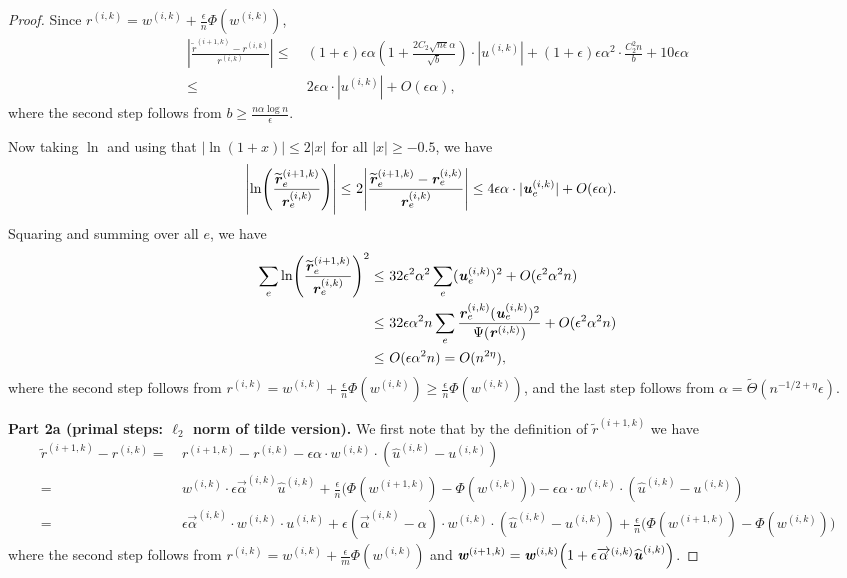 \documentclass[11pt]{article}
\let\originalleft\left
\let\originalright\right
\renewcommand{\left}{\mathopen{}\mathclose\bgroup\originalleft}
\renewcommand{\right}{\aftergroup\egroup\originalright}
\newcommand\rr{\boldsymbol{\mathit{r}}}
\newcommand\uu{\boldsymbol{\mathit{u}}}
\newcommand\ww{\boldsymbol{\mathit{w}}}
\newcommand{\wh}{\widehat}
\newcommand{\wt}{\widetilde}
\begin{document}
\begin{proof}
Since $\rr^{(i,k)} = \ww^{(i,k)} + \frac{\epsilon}{n} \Phi(\ww^{(i,k)})$,
\begin{align*}
|\frac{\wt{\rr}^{(i+1,k)} - \rr^{(i,k)}}{\rr^{(i,k)}}| \leq &~ (1 + \epsilon) \epsilon \alpha (1 + \frac{2 C_2 \sqrt{n \epsilon} \alpha}{\sqrt{b}}) \cdot |\uu^{(i,k)}| + (1 + \epsilon) \epsilon \alpha^2 \cdot \frac{C_2^2 n}{b} + 10 \epsilon \alpha \\
\leq &~ 2 \epsilon \alpha \cdot |\uu^{(i,k)}| + O(\epsilon \alpha),
\end{align*}
where the second step follows from $b \geq \frac{n\alpha\log n}{\epsilon}$.

Now taking $\ln$ and using that $|\ln(1+x)| \leq 2 |x|$ for all $|x| \geq -0.5$, we have
\begin{align*}
\left|\ln\left(\frac{\wt{\rr}^{(i+1,k)}_e}{\rr^{(i,k)}_e}\right)\right| \leq &~ 2 \left|\frac{\wt{\rr}_e^{(i+1,k)} - \rr_e^{(i,k)}}{\rr_e^{(i,k)}}\right| \leq 4 \epsilon \alpha \cdot |\uu_e^{(i,k)}| + O(\epsilon \alpha).
\end{align*}
Squaring and summing over all $e$, we have
\begin{align*}
\sum_e \ln\left(\frac{\wt{\rr}^{(i+1,k)}_e}{\rr^{(i,k)}_e}\right)^2 \leq &~ 32 \epsilon^2 \alpha^2 \sum_e (\uu^{(i,k)}_e)^2 + O(\epsilon^2 \alpha^2 n) \\
\leq &~ 32 \epsilon \alpha^2 n \sum_e \frac{\rr_e^{(i,k)}(\uu^{(i,k)}_e)^2}{\Psi(\rr^{(i,k)})} + O(\epsilon^2 \alpha^2 n) \\
\leq &~ O(\epsilon \alpha^2 n) = O(n^{2 \eta} ),
\end{align*}
where the second step follows from $\rr^{(i,k)} = \ww^{(i,k)} + \frac{\epsilon}{n} \Phi(\ww^{(i,k)}) \geq \frac{\epsilon}{n} \Phi(\ww^{(i,k)})$, and the last step follows from $\alpha = \wt{\Theta}(n^{-1/2 + \eta} \epsilon)$.

\iffalse
{\bf Part 2a (primal steps: $\ell_2$ norm of tilde version).} 
We first note that by the definition of $\wt{\rr}^{(i+1,k)}$ we have
\begin{align*}
\wt{\rr}^{(i+1,k)} - \rr^{(i,k)} 
= &~ \rr^{(i+1,k)} - \rr^{(i,k)} - \epsilon \alpha \cdot \ww^{(i,k)} \cdot (\wh{\uu}^{(i,k)} - \uu^{(i,k)})\\
= &~ \ww^{(i,k)} \cdot \epsilon \overrightarrow{\alpha}^{(i,k)} \wh{\uu}^{(i,k)} + \frac{\epsilon}{n} \Big(\Phi(\ww^{(i+1,k)}) - \Phi(\ww^{(i,k)})\Big) - \epsilon \alpha \cdot \ww^{(i,k)} \cdot (\wh{\uu}^{(i,k)} - \uu^{(i,k)}) \\
= &~ \epsilon \overrightarrow{\alpha}^{(i,k)} \cdot \ww^{(i,k)} \cdot \uu^{(i,k)} + \epsilon (\overrightarrow{\alpha}^{(i,k)} - \alpha) \cdot \ww^{(i,k)} \cdot (\wh{\uu}^{(i,k)} - \uu^{(i,k)}) + \frac{\epsilon}{n} \Big(\Phi(\ww^{(i+1,k)}) - \Phi(\ww^{(i,k)})\Big)
\end{align*}
where the second step follows from $\rr^{(i,k)} = \ww^{(i,k)} + \frac{\epsilon}{m} \Phi(\ww^{(i,k)})$ and $\ww^{(i+1,k)} = \ww^{(i,k)}\left(1 + \epsilon \overrightarrow{\alpha}^{(i,k)} \wh{\uu}^{(i,k)}\right)$.


\end{proof}
\end{document}
